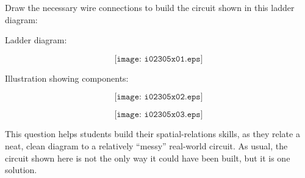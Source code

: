 

Draw the necessary wire connections to build the circuit shown in this ladder diagram:

\vskip 10pt

Ladder diagram:

$$\texttt{[image: i02305x01.eps]}$$

\vskip 10pt

\goodbreak
Illustration showing components:

$$\texttt{[image: i02305x02.eps]}$$







$$\texttt{[image: i02305x03.eps]}$$







This question helps students build their spatial-relations skills, as they relate a neat, clean diagram to a relatively ``messy'' real-world circuit.  As usual, the circuit shown here is not the only way it could have been built, but it is one solution.




